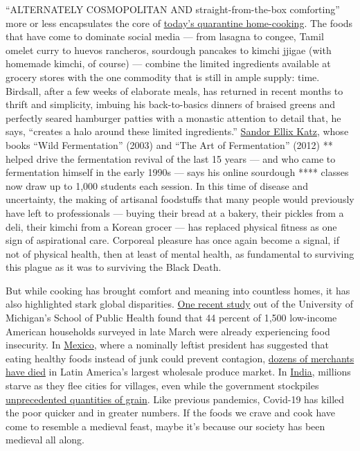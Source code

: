 ``ALTERNATELY COSMOPOLITAN AND straight-from-the-box comforting'' more
or less encapsulates the core of
\href{https://www.nytimes3xbfgragh.onion/article/recipes-cooking-tips-coronavirus.html}{today's
quarantine home-cooking}. The foods that have come to dominate social
media --- from lasagna to congee, Tamil omelet curry to huevos
rancheros, sourdough pancakes to kimchi jjigae (with homemade kimchi, of
course) --- combine the limited ingredients available at grocery stores
with the one commodity that is still in ample supply: time. Birdsall,
after a few weeks of elaborate meals, has returned in recent months to
thrift and simplicity, imbuing his back-to-basics dinners of braised
greens and perfectly seared hamburger patties with a monastic attention
to detail that, he says, ``creates a halo around these limited
ingredients.''
\href{https://www.wildfermentation.com/who-is-sandorkraut/}{Sandor Ellix
Katz}, whose books ``Wild Fermentation'' (2003) and ``The Art of
Fermentation'' (2012) ** helped drive the fermentation revival of the
last 15 years --- and who came to fermentation himself in the early
1990s --- says his online sourdough **** classes now draw up to 1,000
students each session. In this time of disease and uncertainty, the
making of artisanal foodstuffs that many people would previously have
left to professionals --- buying their bread at a bakery, their pickles
from a deli, their kimchi from a Korean grocer --- has replaced physical
fitness as one sign of aspirational care. Corporeal pleasure has once
again become a signal, if not of physical health, then at least of
mental health, as fundamental to surviving this plague as it was to
surviving the Black Death.

But while cooking has brought comfort and meaning into countless homes,
it has also highlighted stark global disparities.
\href{https://sph.umich.edu/news/2020posts/coronavirus-pandemic-worsens-food-insecurity-for-low-income-adults.html}{One
recent study} out of the University of Michigan's School of Public
Health found that 44 percent of 1,500 low-income American households
surveyed in late March were already experiencing food insecurity. In
\href{https://www.nytimes3xbfgragh.onion/interactive/2020/world/americas/mexico-coronavirus-cases.html}{Mexico},
where a nominally leftist president has suggested that eating healthy
foods instead of junk could prevent contagion,
\href{https://www.washingtonpost.com/world/2020/06/21/coronavirus-mexico-city-centro-abasto-market/?arc404=true}{dozens
of merchants have died} in Latin America's largest wholesale produce
market. In
\href{https://www.nytimes3xbfgragh.onion/interactive/2020/world/asia/india-coronavirus-cases.html}{India},
millions starve as they flee cities for villages, even while the
government stockpiles
\href{https://www.bloomberg.com/news/articles/2020-03-24/india-has-enough-food-to-feed-poor-amid-prolonged-shutdown-fears}{unprecedented
quantities of grain}. Like previous pandemics, Covid-19 has killed the
poor quicker and in greater numbers. If the foods we crave and cook have
come to resemble a medieval feast, maybe it's because our society has
been medieval all along.

